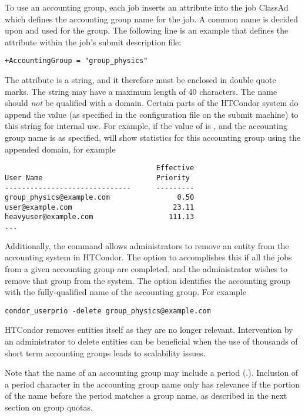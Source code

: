 To use an accounting group,
each job inserts an attribute into the job ClassAd which defines
the accounting group name for the job.
A common name is decided upon and used for the group.
The following line is an example that defines the attribute
within the job's submit description file:
\begin{verbatim}
+AccountingGroup = "group_physics"
\end{verbatim}

The  attribute is a string,
and it therefore must be enclosed in double quote marks.
The string may have a maximum length of 40 characters.
The name should \emph{not} be qualified with a domain.
Certain parts of the HTCondor system 
do append the value 
(as specified in the configuration file on the submit machine)
to this string for internal use.
For example, if the value of  is
, and the accounting group name
is as specified,
 will show statistics
for this accounting group using the appended domain, for example
\footnotesize
\begin{verbatim}
                                    Effective
User Name                           Priority
------------------------------      ---------
group_physics@example.com                0.50
user@example.com                        23.11
heavyuser@example.com                  111.13
...
\end{verbatim}
\normalsize

Additionally, the  command allows administrators to
remove an entity from the accounting system in HTCondor.
The  option to 
accomplishes this
if all the jobs from a given accounting group are completed,
and the administrator wishes to remove that group from the system.
The  option
identifies the accounting group with the fully-qualified name
of the accounting group.
For example
\footnotesize
\begin{verbatim}
condor_userprio -delete group_physics@example.com
\end{verbatim}
\normalsize

HTCondor removes entities itself as they are no longer
relevant.
Intervention by an administrator to delete entities can
be beneficial when the use of thousands
of short term accounting groups leads to scalability
issues.

Note that the name of an accounting group may include a period (.).
Inclusion of a period character in the accounting group name
only has relevance if the portion of the name before the
period matches a group name,
as described in the next section on group quotas.

